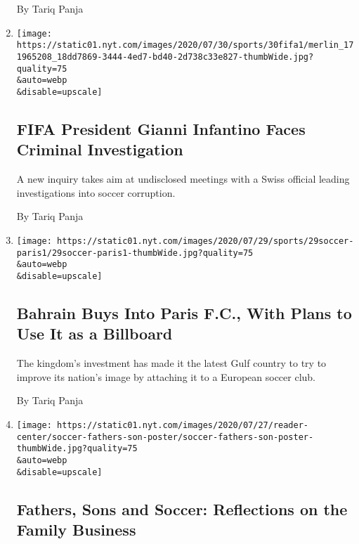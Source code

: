 \begin{enumerate}
  By Tariq Panja
\item
  \href{/2020/07/30/sports/soccer/fifa-gianni-infantino-investigation.html}{}

  \texttt{[image: https://static01.nyt.com/images/2020/07/30/sports/30fifa1/merlin\_171965208\_18dd7869-3444-4ed7-bd40-2d738c33e827-thumbWide.jpg?quality=75\\\&auto=webp\\\&disable=upscale]}

  \hypertarget{fifa-president-gianni-infantino-faces-criminal-investigation}{%
  \subsection{FIFA President Gianni Infantino Faces Criminal
  Investigation}\label{fifa-president-gianni-infantino-faces-criminal-investigation}}

  A new inquiry takes aim at undisclosed meetings with a Swiss official
  leading investigations into soccer corruption.

  By Tariq Panja
\item
  \href{/2020/07/29/sports/soccer/paris-fc-bahrain.html}{}

  \texttt{[image: https://static01.nyt.com/images/2020/07/29/sports/29soccer-paris1/29soccer-paris1-thumbWide.jpg?quality=75\\\&auto=webp\\\&disable=upscale]}

  \hypertarget{bahrain-buys-into-paris-fc-with-plans-to-use-it-as-a-billboard}{%
  \subsection{Bahrain Buys Into Paris F.C., With Plans to Use It as a
  Billboard}\label{bahrain-buys-into-paris-fc-with-plans-to-use-it-as-a-billboard}}

  The kingdom's investment has made it the latest Gulf country to try to
  improve its nation's image by attaching it to a European soccer club.

  By Tariq Panja
\item
  \href{/2020/07/28/sports/soccer/erling-haaland-gio-reyna-thuram.html}{}

  \texttt{[image: https://static01.nyt.com/images/2020/07/27/reader-center/soccer-fathers-son-poster/soccer-fathers-son-poster-thumbWide.jpg?quality=75\\\&auto=webp\\\&disable=upscale]}

  \hypertarget{fathers-sons-and-soccer-reflections-on-the-family-business}{%
  \subsection{Fathers, Sons and Soccer: Reflections on the Family
  Business}\label{fathers-sons-and-soccer-reflections-on-the-family-business}}


\end{enumerate}
